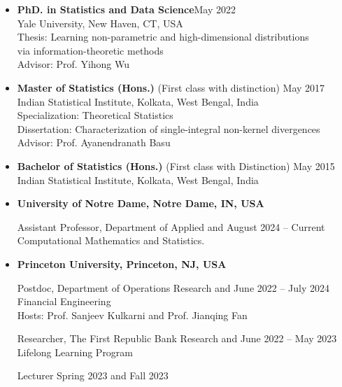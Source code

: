 \documentclass[letterpaper,12pt,oneside]{article}
\theoremstyle{definition}
\begin{document}
			\begin{itemize}
				\item[] {\bf PhD. in Statistics and Data Science}\hfill May 2022\\
				Yale University, New Haven, CT, USA\\
				Thesis: Learning non-parametric and high-dimensional distributions\\ 
				via information-theoretic
				methods \\
				Advisor: {Prof. Yihong Wu}  
				
				\item[] {\bf 	Master of Statistics (Hons.)} (First class with distinction) \hfill May 2017\\
				Indian Statistical Institute, Kolkata, West Bengal, India\\
				Specialization: Theoretical Statistics\\
				Dissertation: Characterization of single-integral non-kernel divergences \\
				Advisor: Prof. Ayanendranath Basu
				
				\item[] 
				{\bf Bachelor of Statistics (Hons.)} (First class with Distinction) \hfill May 2015 \\
				{Indian Statistical Institute, Kolkata, West Bengal, India}  
			\end{itemize}
			
			
			\begin{itemize}
				
				\item[] {\bf University of Notre Dame, Notre Dame, IN, USA}
				
				Assistant Professor, Department of Applied and \hfill August 2024 --  Current\\
				Computational Mathematics and Statistics.
				
				\item[] {\bf Princeton University, Princeton, NJ, USA}
				
				Postdoc,  Department of Operations Research and 
				\hfill June 2022 -- July 2024\\ Financial Engineering \\
				Hosts: Prof. Sanjeev Kulkarni and Prof. Jianqing Fan 
				
				Researcher, The First Republic Bank Research and  \hfill June 2022 -- May 2023\\
				Lifelong Learning Program
				
				Lecturer \hfill Spring 2023 and Fall 2023
				
			\end{itemize}
			
\end{document}
